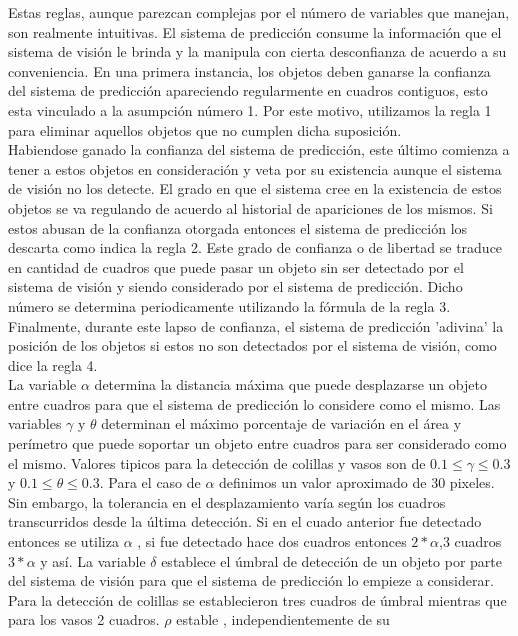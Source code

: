 Estas reglas, aunque parezcan complejas por el número de variables que 
manejan, son realmente intuitivas. El sistema de predicción consume la 
información que el sistema de visión le brinda y la manipula con 
cierta desconfianza de acuerdo a su 
conveniencia. En una primera instancia, los objetos deben ganarse la 
confianza del sistema de predicción apareciendo regularmente en 
cuadros contiguos, esto esta vinculado a la asumpción número 
1. Por este motivo, utilizamos la regla 1 para eliminar aquellos objetos que 
no cumplen dicha suposición. \\
	Habiendose ganado la confianza del sistema de predicción, este 
	último comienza a tener a estos objetos en consideración y veta por su 
existencia aunque el sistema de visión no los detecte. El grado en que 
el sistema cree en la existencia de estos objetos se va regulando de 
acuerdo al historial de apariciones de los mismos. Si estos abusan de 
la confianza otorgada entonces el sistema de predicción los descarta 
como indica la regla 2. 
Este grado de confianza o de libertad se traduce en cantidad de 
cuadros que puede pasar un objeto sin ser detectado por el sistema de 
visión y siendo considerado por el sistema de predicción. Dicho 
número se determina periodicamente utilizando la fórmula de la regla 3.
Finalmente, durante este lapso de confianza, el sistema de predicción 
'adivina' la posición de los objetos si estos no son detectados por el 
sistema de visión, como dice la regla 4. \\
\indent La variable $\alpha$ determina la distancia máxima que puede 
desplazarse un objeto entre cuadros para que el sistema de predicción lo considere 
como el mismo. Las variables $\gamma$ y $\theta$ determinan el máximo 
porcentaje de variación en el área y perímetro que puede soportar un 
objeto entre cuadros para ser considerado como el mismo. Valores 
tipicos para la detección de colillas y vasos son de 
$0.1\leq\gamma\leq0.3$ y $0.1\leq\theta\leq0.3$. Para el caso de 
$\alpha$ definimos un valor aproximado de 30 pixeles. Sin embargo, la 
tolerancia en el desplazamiento varía según los cuadros transcurridos desde la última 
detección. Si en el cuado anterior fue detectado entonces se utiliza 
$\alpha$ , si fue detectado hace dos cuadros entonces $2*\alpha$,3 
cuadros $3*\alpha$ y así. La variable $\delta$ establece el úmbral de 
detección de un objeto por parte del sistema de visión para que el 
sistema de predicción lo empieze  a considerar. Para la detección de 
colillas se establecieron tres cuadros de úmbral mientras que para los 
vasos 2 cuadros. $\rho$ estable , independientemente de su 
